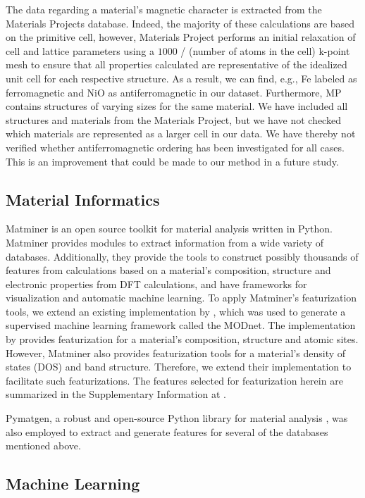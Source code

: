 \documentclass[superscriptaddress,
preprint,
 amsmath,amssymb,
 aps,
]{revtex4-2}
\begin{document}
The data regarding a material's magnetic character is extracted from the Materials Projects database. Indeed, the majority of these calculations are based on the primitive cell, however, Materials Project performs an initial relaxation of cell and lattice parameters using a $1000$ / (number of atoms in the cell) k-point mesh to ensure that all properties calculated are representative of the idealized unit cell for each respective structure. As a result, we can find, e.g., Fe labeled as ferromagnetic and NiO as antiferromagnetic in our dataset. Furthermore, MP contains structures of varying sizes for the same material. We have included all structures and materials from the Materials Project, but we have not checked which materials are represented as a larger cell in our data. We have thereby not verified whether antiferromagnetic ordering has been investigated for all cases. This is an improvement that could be made to our method in a future study. 

\subsection*{Material Informatics}  
Matminer \cite{Ward2018} is an open source toolkit for material analysis written in Python. Matminer provides modules to extract information from a wide variety of databases. Additionally, they provide the tools to construct possibly thousands of features from calculations based on a material's composition, structure and electronic properties from DFT calculations, and have frameworks for visualization and automatic machine learning. 
To apply Matminer's featurization tools, we extend an existing implementation by \citeauthor{Breuck2021} \cite{Breuck2021}, which was used to generate a supervised machine learning framework called the MODnet. The implementation by \citeauthor{Breuck2021} provides featurization for a material's composition, structure and atomic sites. However, Matminer also provides featurization tools for a material's density of states (DOS) and band structure. Therefore, we extend their implementation to facilitate such featurizations. The features selected for featurization herein are summarized in the Supplementary Information at \cite{supplementary}. 

Pymatgen, a robust and open-source Python library for material analysis \cite{pymatgen}, was also employed to extract and generate features for several of the databases mentioned above. 

\subsection*{Machine Learning} 
\end{document}
